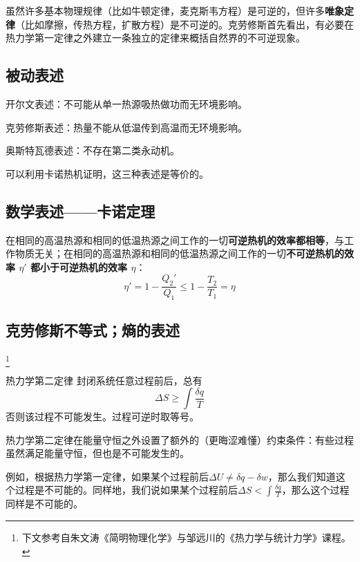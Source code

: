 
\begin{issues}
\issueDraft
\end{issues}


虽然许多基本物理规律（比如牛顿定律，麦克斯韦方程）是可逆的，但许多\textbf{唯象定律}（比如摩擦，传热方程，扩散方程）是不可逆的。克劳修斯首先看出，有必要在热力学第一定律之外建立一条独立的定律来概括自然界的不可逆现象。

\subsection{被动表述}
开尔文表述：不可能从单一热源吸热做功而无环境影响。

克劳修斯表述：热量不能从低温传到高温而无环境影响。

奥斯特瓦德表述：不存在第二类永动机。

可以利用卡诺热机证明，这三种表述是等价的。

\subsection{数学表述——卡诺定理}

在相同的高温热源和相同的低温热源之间工作的一切\textbf{可逆热机的效率都相等}，与工作物质无关；在相同的高温热源和相同的低温热源之间工作的一切\textbf{不可逆热机的效率 $\eta'$ 都小于可逆热机的效率 $\eta$}：
\begin{equation}
\eta'=1-\frac{Q_2'}{Q_1}\le 1-\frac{T_2}{T_1}=\eta
\end{equation}

\subsection{克劳修斯不等式；熵的表述}
\footnote{下文参考自朱文涛《简明物理化学》与邹远川的《热力学与统计力学》课程。}

\begin{theorem}{热力学第二定律}
封闭系统任意过程前后，总有
\begin{equation}
\Delta S \ge \int \frac{\delta q}{T}
\end{equation}
否则该过程不可能发生。过程可逆时取等号。
\end{theorem}
热力学第二定律在能量守恒之外设置了额外的（更晦涩难懂）约束条件：有些过程虽然满足能量守恒，但也是不可能发生的。

例如，根据热力学第一定律，如果某个过程前后$\Delta U \ne \delta q - \delta w$，那么我们知道这个过程是不可能的。同样地，我们说如果某个过程前后$\Delta S < \int \frac{\delta q}{T}$，那么这个过程同样是不可能的。

